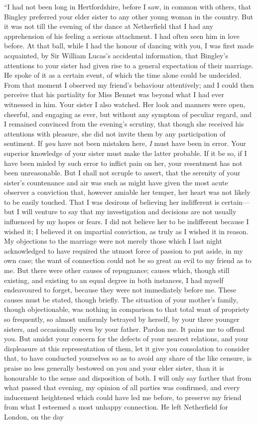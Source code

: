 “I had not been long in Hertfordshire, before I saw, in common with others, that Bingley preferred your elder sister to any other young woman in the country. But it was not till the evening of the dance at Netherfield that I had any apprehension of his feeling a serious attachment. I had often seen him in love before. At that ball, while I had the honour of dancing with you, I was first made acquainted, by Sir William Lucas's accidental information, that Bingley's attentions to your sister had given rise to a general expectation of their marriage. He spoke of it as a certain event, of which the time alone could be undecided. From that moment I observed my friend's behaviour attentively; and I could then perceive that his partiality for Miss Bennet was beyond what I had ever witnessed in him. Your sister I also watched. Her look and manners were open, cheerful, and engaging as ever, but without any symptom of peculiar regard, and I remained convinced from the evening's scrutiny, that though she received his attentions with pleasure, she did not invite them by any participation of sentiment. If {\em you} have not been mistaken here, {\em I} must have been in error. Your superior knowledge of your sister must make the latter probable. If it be so, if I have been misled by such error to inflict pain on her, your resentment has not been unreasonable. But I shall not scruple to assert, that the serenity of your sister's countenance and air was such as might have given the most acute observer a conviction that, however amiable her temper, her heart was not likely to be easily touched. That I was desirous of believing her indifferent is certain---but I will venture to say that my investigation and decisions are not usually influenced by my hopes or fears. I did not believe her to be indifferent because I wished it; I believed it on impartial conviction, as truly as I wished it in reason. My objections to the marriage were not merely those which I last night acknowledged to have required the utmost force of passion to put aside, in my own case; the want of connection could not be so great an evil to my friend as to me. But there were other causes of repugnance; causes which, though still existing, and existing to an equal degree in both instances, I had myself endeavoured to forget, because they were not immediately before me. These causes must be stated, though briefly. The situation of your mother's family, though objectionable, was nothing in comparison to that total want of propriety so frequently, so almost uniformly betrayed by herself, by your three younger sisters, and occasionally even by your father. Pardon me. It pains me to offend you. But amidst your concern for the defects of your nearest relations, and your displeasure at this representation of them, let it give you consolation to consider that, to have conducted yourselves so as to avoid any share of the like censure, is praise no less generally bestowed on you and your elder sister, than it is honourable to the sense and disposition of both. I will only say farther that from what passed that evening, my opinion of all parties was confirmed, and every inducement heightened which could have led me before, to preserve my friend from what I esteemed a most unhappy connection. He left Netherfield for London, on the day 